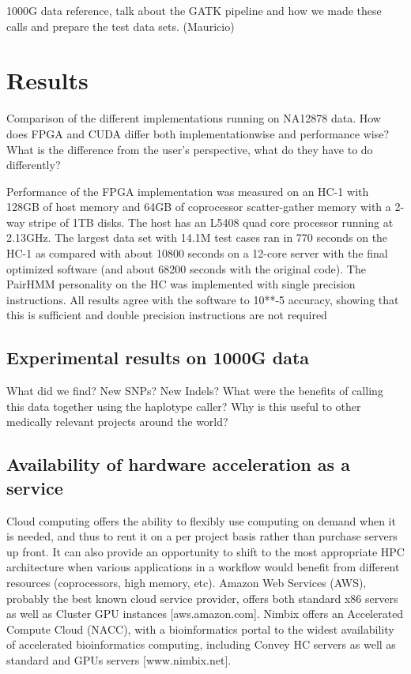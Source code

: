 \documentclass[11pt, oneside]{article}
\begin{document}
	1000G data reference, talk about the GATK pipeline and how we made these
	calls and prepare the test data sets. (Mauricio) 
	
	\section{Results}

	Comparison of the different implementations running on NA12878 data.  How
	does FPGA and CUDA differ both implementationwise and performance wise?
	What is the difference from the user's perspective, what do they have to do
	differently?  
	
	Performance of the FPGA implementation was measured on an HC-1 with 128GB of
	host memory and 64GB of coprocessor scatter-gather memory with a 2-way
	stripe of 1TB disks.  The host has an L5408 quad core processor running at
	2.13GHz.  The largest data set with 14.1M test cases ran in 770 seconds on
	the HC-1 as compared with about 10800 seconds on a 12-core server with the
	final optimized software (and about 68200 seconds with the original code).
	The PairHMM personality on the HC was implemented with single precision
	instructions.  All results agree with the software to 10**-5 accuracy,
	showing that this is sufficient and double precision instructions are not
	required

	\subsection{Experimental results on 1000G data} 
	
	What did we find? New SNPs? New Indels?  What were the benefits of calling
	this data together using the haplotype caller?  Why is this useful to other
	medically relevant projects around the world?  
	
	\subsection{Availability of hardware acceleration as a service} 

	Cloud computing offers the ability to flexibly use computing on demand when
	it is needed, and thus to rent it on a per project basis rather than
	purchase servers up front.  It can also provide an opportunity to shift to
	the most appropriate HPC architecture when various applications in a
	workflow would benefit from different resources (coprocessors, high memory,
	etc).  Amazon Web Services (AWS), probably the best known cloud
	service provider, offers both standard x86 servers as well as Cluster GPU
	instances [aws.amazon.com].  Nimbix offers an Accelerated Compute Cloud
	(NACC), with a bioinformatics portal to the widest availability of
	accelerated bioinformatics computing, including Convey HC servers as well as
	standard and GPUs servers [www.nimbix.net].
\end{document}
